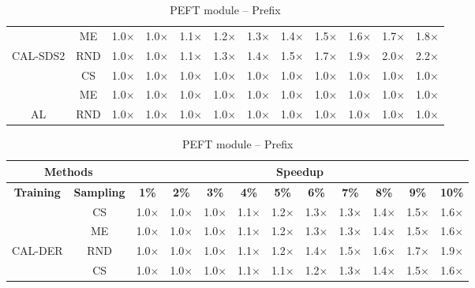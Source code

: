 \begin{table}[htbp]
\begin{subtable}{\linewidth}
\begin{tabular}{c|c|cccccccccc}
 & ME & 1.0$\times$ & 1.0$\times$ & 1.1$\times$ & 1.2$\times$ & 1.3$\times$ & 1.4$\times$ & 1.5$\times$ & 1.6$\times$ & 1.7$\times$ & 1.8$\times$\\

\multirow{-3}{*}{\raggedright\arraybackslash CAL-SDS2} & RND & 1.0$\times$ & 1.0$\times$ & 1.1$\times$ & 1.3$\times$ & 1.4$\times$ & 1.5$\times$ & 1.7$\times$ & 1.9$\times$ & 2.0$\times$ & 2.2$\times$\\
\midrule
 & CS & 1.0$\times$ & 1.0$\times$ & 1.0$\times$ & 1.0$\times$ & 1.0$\times$ & 1.0$\times$ & 1.0$\times$ & 1.0$\times$ & 1.0$\times$ & 1.0$\times$\\

 & ME & 1.0$\times$ & 1.0$\times$ & 1.0$\times$ & 1.0$\times$ & 1.0$\times$ & 1.0$\times$ & 1.0$\times$ & 1.0$\times$ & 1.0$\times$ & 1.0$\times$\\

\multirow{-3}{*}{\raggedright\arraybackslash AL} & RND & 1.0$\times$ & 1.0$\times$ & 1.0$\times$ & 1.0$\times$ & 1.0$\times$ & 1.0$\times$ & 1.0$\times$ & 1.0$\times$ & 1.0$\times$ & 1.0$\times$\\
\bottomrule
\end{tabular}
\end{subtable}
\vspace{1em}
\begin{subtable}{\linewidth}
\centering
\caption{PEFT module -- Prefix}

\begin{tabular}{c|c|cccccccccc}
\toprule
\multicolumn{2}{c|}{\textbf{Methods}} & \multicolumn{10}{c}{\textbf{Speedup}} \\
\midrule
\textbf{Training} & \textbf{Sampling} & \textbf{1\%} & \textbf{2\%} & \textbf{3\%} & \textbf{4\%} & \textbf{5\%} & \textbf{6\%} & \textbf{7\%} & \textbf{8\%} & \textbf{9\%} & \textbf{10\%}\\
\midrule
 & CS & 1.0$\times$ & 1.0$\times$ & 1.0$\times$ & 1.1$\times$ & 1.2$\times$ & 1.3$\times$ & 1.3$\times$ & 1.4$\times$ & 1.5$\times$ & 1.6$\times$\\

 & ME & 1.0$\times$ & 1.0$\times$ & 1.0$\times$ & 1.1$\times$ & 1.2$\times$ & 1.3$\times$ & 1.3$\times$ & 1.4$\times$ & 1.5$\times$ & 1.6$\times$\\

\multirow{-3}{*}{\raggedright\arraybackslash CAL-DER} & RND & 1.0$\times$ & 1.0$\times$ & 1.0$\times$ & 1.1$\times$ & 1.2$\times$ & 1.4$\times$ & 1.5$\times$ & 1.6$\times$ & 1.7$\times$ & 1.9$\times$\\
\midrule
 & CS & 1.0$\times$ & 1.0$\times$ & 1.0$\times$ & 1.1$\times$ & 1.1$\times$ & 1.2$\times$ & 1.3$\times$ & 1.4$\times$ & 1.5$\times$ & 1.6$\times$\\


\end{tabular}
\end{subtable}
\end{table}
